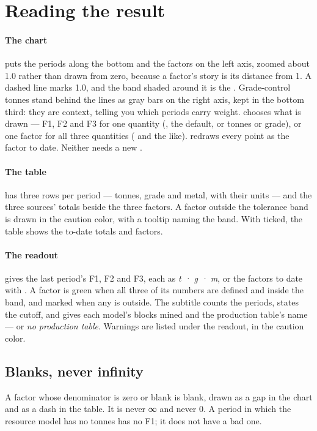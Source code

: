 \section{Reading the result}\label{sec:factors-reading}
\paragraph{The chart} puts the periods along the bottom and the factors on the left axis, zoomed about 1.0 rather than drawn from zero, because a factor's story is its distance from 1. A dashed line marks 1.0, and the band shaded around it is the . Grade-control tonnes stand behind the lines as gray bars on the right axis, kept in the bottom third: they are context, telling you which periods carry weight.  chooses what is drawn — F1, F2 and F3 for one quantity (, the default, or tonnes or grade), or one factor for all three quantities ( and the like).  redraws every point as the factor to date. Neither needs a new .

\paragraph{The table} has three rows per period — tonnes, grade and metal, with their units — and the three sources' totals beside the three factors. A factor outside the tolerance band is drawn in the caution color, with a tooltip naming the band. With  ticked, the table shows the to-date totals and factors.

\paragraph{The readout} gives the last period's F1, F2 and F3, each as \emph{t · g · m}, or the factors to date with . A factor is green when all three of its numbers are defined and inside the band, and marked when any is outside. The subtitle counts the periods, states the cutoff, and gives each model's blocks mined and the production table's name — or \emph{no production table}. Warnings are listed under the readout, in the caution color.

\subsection{Blanks, never infinity}\label{sec:factors-blanks}
A factor whose denominator is zero or blank is blank, drawn as a gap in the chart and as a dash in the table. It is never ∞ and never 0. A period in which the resource model has no tonnes has no F1; it does not have a bad one.

